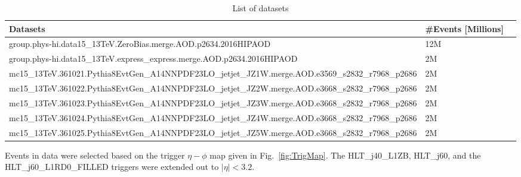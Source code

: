 \begin{table}[ht]
\tiny
\caption{List of datasets}
\centering
\begin{tabular*}{\textwidth}{l @{\extracolsep{\fill}} ll}
\hline\hline
Datasets & \#Events [Millions] \\  %
\hline
group.phys-hi.data15\_13TeV.ZeroBias.merge.AOD.p2634.2016HIPAOD & 12M \\
group.phys-hi.data15\_13TeV.express\_express.merge.AOD.p2634.2016HIPAOD & 2M \\
mc15\_13TeV.361021.Pythia8EvtGen\_A14NNPDF23LO\_jetjet\_JZ1W.merge.AOD.e3569\_s2832\_r7968\_p2686 & 2M \\
mc15\_13TeV.361022.Pythia8EvtGen\_A14NNPDF23LO\_jetjet\_JZ2W.merge.AOD.e3668\_s2832\_r7968\_p2686 & 2M \\
mc15\_13TeV.361023.Pythia8EvtGen\_A14NNPDF23LO\_jetjet\_JZ3W.merge.AOD.e3668\_s2832\_r7968\_p2686 & 2M \\
mc15\_13TeV.361024.Pythia8EvtGen\_A14NNPDF23LO\_jetjet\_JZ4W.merge.AOD.e3668\_s2832\_r7968\_p2686 & 2M \\
mc15\_13TeV.361025.Pythia8EvtGen\_A14NNPDF23LO\_jetjet\_JZ5W.merge.AOD.e3668\_s2832\_r7968\_p2686 & 2M \\ [1ex]
\hline
\end{tabular*}
\label{table:datasets}
\end{table}


Events in data were selected based on the trigger $\eta-\phi$ map given in  Fig.~\ref{fig:TrigMap}. The HLT\_j40\_L1ZB, HLT\_j60, and the HLT\_j60\_L1RD0\_FILLED triggers were extended out to $|\eta| < 3.2 $.

%

